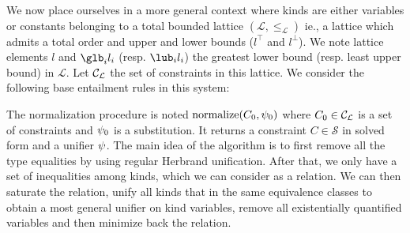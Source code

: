 We now place ourselves in a more general context where kinds are either variables
or constants belonging to a total bounded lattice $(\mathcal L, \leq_{\mathcal L})$ ie.,
a lattice which admits a total order and upper and lower bounds ($l^\top$ and $l^\bot$).
We note lattice elements $l$ and $\glb_i l_i$ (resp. $\lub_i l_i$)
the greatest lower bound (resp. least upper bound) in $\mathcal L$.
%
Let ${\mathcal C_{\mathcal L}}$ the set of constraints in this lattice. We consider the
following base entailment rules in this system:
\begin{center}
\end{center}



The normalization procedure is noted $\operatorname{normalize}(C_0,\mathrm{\psi}_0)$ where
$C_0\in {\mathcal C_{\mathcal L}}$ is a set of constraints and $\mathrm{\psi}_0$ is a substitution.
It returns a constraint $C \in \mathcal S$ in
solved form and a unifier $\mathrm{\psi}$.
The main idea of the algorithm is to first remove all the type equalities
by using regular Herbrand unification. After that, we only have
a set of inequalities among kinds, which we can consider as a relation.
We can then saturate the relation,
unify all kinds that in the same equivalence classes to obtain
a most general unifier on kind variables,
remove all existentially quantified variables and
then minimize back the relation.

